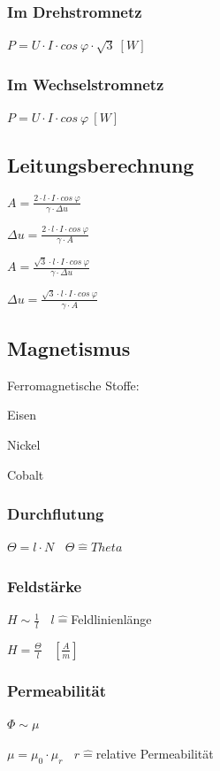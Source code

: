 \documentclass[12pt,a4paper]{article}
\begin{document}
\subsubsection{Im Drehstromnetz}
$P = U \cdot I \cdot cos~\varphi \cdot \sqrt{3}~[W]$
\subsubsection{Im Wechselstromnetz}
$P = U \cdot I \cdot cos~\varphi~[W]$
\subsection{Leitungsberechnung}
\begin{description}
\item $A = \frac{2 \cdot l \cdot I \cdot cos~\varphi}{\gamma \cdot \Delta u}$
\item $\Delta u = \frac{2 \cdot l \cdot I \cdot cos~\varphi}{\gamma \cdot A}$
\item $A = \frac{\sqrt{3} \cdot l \cdot I \cdot cos~\varphi}{\gamma \cdot \Delta u}$
\item $\Delta u = \frac{\sqrt{3} \cdot l \cdot I \cdot cos~\varphi}{\gamma \cdot A}$
\end{description}
\subsection{Magnetismus}
Ferromagnetische Stoffe:
\begin{description}
\item Eisen
\item Nickel
\item Cobalt
\end{description}
\subsubsection{Durchflutung}
$\Theta = l \cdot N~~~~\Theta \widehat{=} Theta$
\subsubsection{Feldstärke}
\begin{description}
\item $H \sim \frac{1}{l}~~~~l \widehat{=} $Feldlinienlänge
\item $H = \frac{\Theta}{l}~~~~[\frac{A}{m}]$
\end{description}
\subsubsection{Permeabilität}
\begin{description}
\item $\Phi \sim \mu$
\item $\mu = \mu_{0} \cdot \mu_{r}~~~~r \widehat{=} $relative Permeabilität
\end{description}
\end{document}
